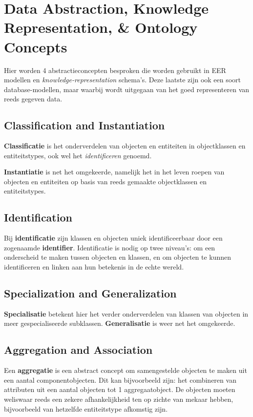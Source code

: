 \section{Data Abstraction, Knowledge Representation, \& Ontology Concepts}
Hier worden 4 abstractieconcepten besproken die worden gebruikt in EER modellen en \textit{knowledge-representation} schema's. Deze laatste zijn ook een soort database-modellen, maar waarbij wordt uitgegaan van het goed representeren van reeds gegeven data.

\subsection{Classification and Instantiation}
\textbf{Classificatie} is het onderverdelen van objecten en entiteiten in objectklassen en entiteitstypes, ook wel het \textit{identificeren} genoemd. 

\textbf{Instantiatie} is net het omgekeerde, namelijk het in het leven roepen van objecten en entiteiten op basis van reeds gemaakte objectklassen en entiteitstypes.

\subsection{Identification}
Bij \textbf{identificatie} zijn klassen en objecten uniek identificeerbaar door een zogenaamde \textbf{identifier}. Identificatie is nodig op twee niveau's: om een onderscheid te maken tussen objecten en klassen, en om objecten te kunnen identificeren en linken aan hun betekenis in de echte wereld.

\subsection{Specialization and Generalization}
\textbf{Specialisatie} betekent hier het verder onderverdelen van klassen van objecten in meer gespecialiseerde subklassen. \textbf{Generalisatie} is weer net het omgekeerde.

\subsection{Aggregation and Association}
Een \textbf{aggregatie} is een abstract concept om samengestelde objecten te maken uit een aantal componentobjecten. Dit kan bijvoorbeeld zijn: het combineren van attributen uit een aantal objecten tot 1 aggregaatobject. De objecten moeten weliswaar reeds een zekere afhankelijkheid ten op zichte van mekaar hebben, bijvoorbeeld van hetzelfde entiteitstype afkomstig zijn.

